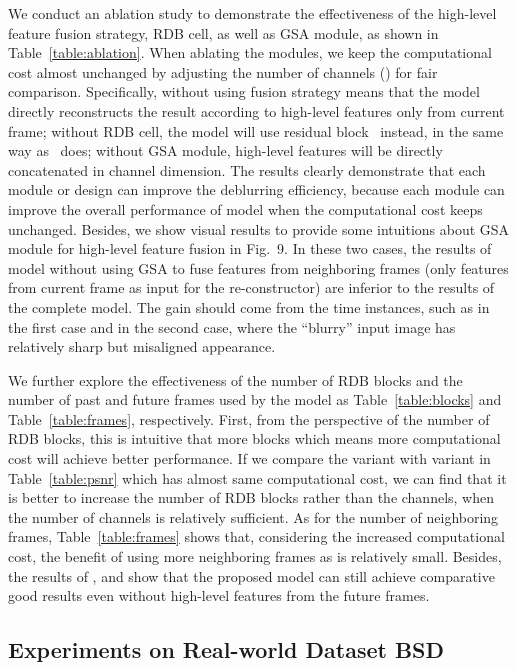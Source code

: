 \documentclass[twocolumn]{svjour3}          \smartqed  \usepackage{graphicx}
\begin{document}
We conduct an ablation study to demonstrate the effectiveness of the high-level feature fusion strategy, RDB cell, as well as GSA module, as shown in Table~\ref{table:ablation}. When ablating the modules, we keep the computational cost almost unchanged by adjusting the number of channels () for fair comparison. Specifically, without using fusion strategy means that the model directly reconstructs the result according to high-level features only from current frame; without RDB cell, the model will use residual block~\cite{he2016deep} instead, in the same way as~\cite{nah2017deep} does; without GSA module, high-level features will be directly concatenated in channel dimension. The results clearly demonstrate that each module or design can improve the deblurring efficiency, because each module can improve the overall performance of model when the computational cost keeps unchanged. Besides, we show visual results to provide some intuitions about GSA module for high-level feature fusion in Fig.~9. In these two cases, the results of model without using GSA to fuse features from neighboring frames (only features from current frame as input for the re-constructor) are inferior to the results of the complete model. The gain should come from the time instances, such as  in the first case and  in the second case, where the ``blurry'' input image has relatively sharp but misaligned appearance.

We further explore the effectiveness of the number of RDB blocks and the number of past and future frames used by the model as Table~\ref{table:blocks} and Table~\ref{table:frames}, respectively. First, from the perspective of the number of RDB blocks, this is intuitive that more blocks which means more computational cost will achieve better performance. If we compare the variant  with variant  in Table~\ref{table:psnr} which has almost same computational cost, we can find that it is better to increase the number of RDB blocks rather than the channels, when the number of channels is relatively sufficient. As for the number of neighboring frames, Table~\ref{table:frames} shows that, considering the increased computational cost, the benefit of using more neighboring frames as  is relatively small. Besides, the results of ,  and  show that the proposed model can still achieve comparative good results even without high-level features from the future frames.

\subsection{Experiments on Real-world Dataset BSD}
\end{document}
